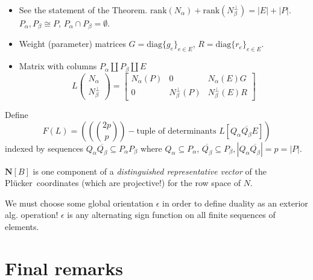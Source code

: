 \documentclass[Unicode]{cedram-alco}
\newcommand{\ext}[1]{\ensuremath{\mathbf{#1}}}
\newcommand{\Plucker}{Pl\"{u}cker\ }
\newcommand{\Nal}{\ensuremath{N_{\alpha}}}
\newcommand{\NbePe}{\ensuremath{N_{\beta}^{\perp}}}
\newcommand{\dunion}{\coprod}
\begin{document}
      \begin{itemize}
  \item
    See the statement of the Theorem.
    $\text{rank}(\Nal)+\text{rank}(\NbePe)=|E|+|P|$.   %
    $P_{\alpha},P_{\beta}\cong P$, $P_{\alpha}\cap P_{\beta}=\emptyset$.
  \item
    Weight (parameter) matrices  %
    $G=\text{diag}\{g_e\}_{e\in E} $,
    $R=\text{diag}\{r_e\}_{e\in E} $.
  \item
    Matrix with columns $P_\alpha \dunion P_\beta \dunion E$
    \[
    L\left( \begin{array}{c} \Nal\\ \NbePe \end{array} \right)
    = \left[\begin{array}{c|c|c} \Nal(P)  &  0  &  \Nal(E)G \\  \hline
0  & \NbePe(P)  &  \NbePe(E)R \end{array}\right]
    \]
  \end{itemize}

  Define
  \[
  F(L)=((\binom{2p}{p})-\text{tuple of determinants\ } L[Q_\alpha\overline{Q_\beta}E])
  \]
  indexed by sequences $Q_\alpha \overline{Q_\beta} \subseteq P_\alpha P_\beta$ where
  $Q_\alpha\subseteq P_\alpha$, $\overline{Q_\beta}\subseteq P_\beta, |Q_\alpha \overline{Q_\beta}|=p=|P|$.







$\ext{N}[B]$ is one component of a \emph{distinguished representative
vector} of the \Plucker coordinates (which are projective!) for the
row space of $N$.



We must choose some global orientation $\epsilon$ in order to define
duality as an exterior alg. operation!  $\epsilon$ is any alternating
sign function on all finite sequences of elements.\\



\section{Final remarks}





\end{document}
